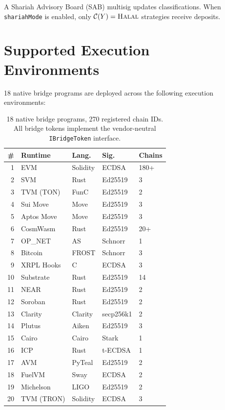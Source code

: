 \documentclass[11pt]{article}
\begin{document}
A Shariah Advisory Board (SAB) multisig updates classifications. When \texttt{shariahMode} is enabled, only $\mathcal{C}(Y) = \textsc{Halal}$ strategies receive deposits.

\section{Supported Execution Environments}
\label{sec:chains}

18 native bridge programs are deployed across the following execution environments:

\begin{table}[h]
\centering
\scriptsize
\begin{tabular}{rllll}
\toprule
\textbf{\#} & \textbf{Runtime} & \textbf{Lang.} & \textbf{Sig.} & \textbf{Chains} \\
\midrule
1 & EVM & Solidity & ECDSA & 180+ \\
2 & SVM & Rust & Ed25519 & 3 \\
3 & TVM (TON) & FunC & Ed25519 & 2 \\
4 & Sui Move & Move & Ed25519 & 3 \\
5 & Aptos Move & Move & Ed25519 & 3 \\
6 & CosmWasm & Rust & Ed25519 & 20+ \\
7 & OP\_NET & AS & Schnorr & 1 \\
8 & Bitcoin & FROST & Schnorr & 3 \\
9 & XRPL Hooks & C & ECDSA & 3 \\
10 & Substrate & Rust & Ed25519 & 14 \\
11 & NEAR & Rust & Ed25519 & 2 \\
12 & Soroban & Rust & Ed25519 & 2 \\
13 & Clarity & Clarity & secp256k1 & 2 \\
14 & Plutus & Aiken & Ed25519 & 3 \\
15 & Cairo & Cairo & Stark & 1 \\
16 & ICP & Rust & t-ECDSA & 1 \\
17 & AVM & PyTeal & Ed25519 & 2 \\
18 & FuelVM & Sway & ECDSA & 2 \\
19 & Michelson & LIGO & Ed25519 & 2 \\
20 & TVM (TRON) & Solidity & ECDSA & 3 \\
\bottomrule
\end{tabular}
\caption{18 native bridge programs, 270 registered chain IDs. All bridge tokens implement the vendor-neutral \texttt{IBridgeToken} interface.}
\label{tab:runtimes}
\end{table}
\end{document}
